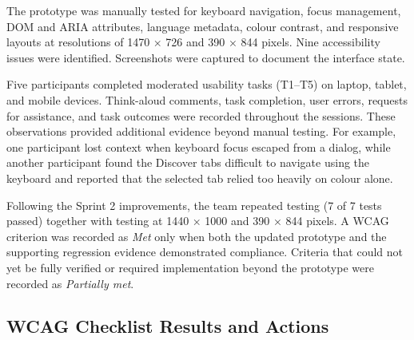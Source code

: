 \documentclass[11pt,a4paper]{article}
\begin{document}
The prototype was manually tested for keyboard navigation, focus management,
DOM and ARIA attributes, language metadata, colour contrast, and responsive
layouts at resolutions of 1470 × 726 and 390 × 844 pixels. Nine accessibility
issues were identified.
Screenshots were captured to document the interface state.

Five participants completed moderated usability tasks (T1–T5) on laptop,
tablet, and mobile devices. Think-aloud comments, task completion, user
errors, requests for assistance, and task outcomes were recorded throughout
the sessions. These observations provided additional evidence beyond
manual testing. For example, one participant lost context when keyboard
focus escaped from a dialog, while another participant found the Discover
tabs difficult to navigate using the keyboard and reported that the selected
tab relied too heavily on colour alone.

Following the Sprint 2 improvements, the team repeated testing
(7 of 7 tests passed) together with testing at
1440 × 1000 and 390 × 844 pixels. A WCAG criterion was recorded as
\textit{Met} only when both the updated prototype and the supporting
regression evidence demonstrated compliance. Criteria that could not yet be
fully verified or required implementation beyond the prototype were recorded
as \textit{Partially met}.

\subsection{WCAG Checklist Results and Actions}
\label{subseca11yresults}
\end{document}
